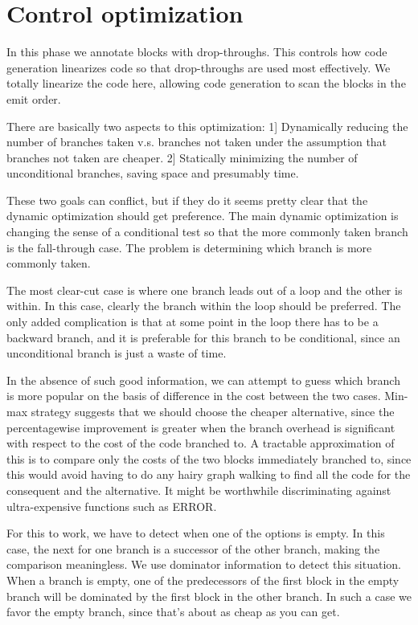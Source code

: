 
\chapter{Control optimization}

In this phase we annotate blocks with drop-throughs.  This controls how code
generation linearizes code so that drop-throughs are used most effectively.  We
totally linearize the code here, allowing code generation to scan the blocks
in the emit order.

There are basically two aspects to this optimization:
 1] Dynamically reducing the number of branches taken v.s. branches not
    taken under the assumption that branches not taken are cheaper.
 2] Statically minimizing the number of unconditional branches, saving space
    and presumably time.

These two goals can conflict, but if they do it seems pretty clear that the
dynamic optimization should get preference.  The main dynamic optimization is
changing the sense of a conditional test so that the more commonly taken branch
is the fall-through case.  The problem is determining which branch is more
commonly taken.

The most clear-cut case is where one branch leads out of a loop and the other
is within.  In this case, clearly the branch within the loop should be
preferred.  The only added complication is that at some point in the loop there
has to be a backward branch, and it is preferable for this branch to be
conditional, since an unconditional branch is just a waste of time.

In the absence of such good information, we can attempt to guess which branch
is more popular on the basis of difference in the cost between the two cases.
Min-max strategy suggests that we should choose the cheaper alternative, since
the percentagewise improvement is greater when the branch overhead is
significant with respect to the cost of the code branched to.  A tractable
approximation of this is to compare only the costs of the two blocks
immediately branched to, since this would avoid having to do any hairy graph
walking to find all the code for the consequent and the alternative.  It might
be worthwhile discriminating against ultra-expensive functions such as ERROR.

For this to work, we have to detect when one of the options is empty.  In this
case, the next for one branch is a successor of the other branch, making the
comparison meaningless.  We use dominator information to detect this situation.
When a branch is empty, one of the predecessors of the first block in the empty
branch will be dominated by the first block in the other branch.  In such a
case we favor the empty branch, since that's about as cheap as you can get.

